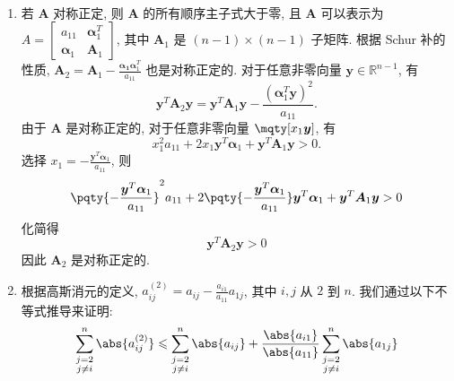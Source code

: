 \documentclass[lang = zh]{iwork}
\begin{document}
\begin{sol} ~
  \begin{enumerate}
    \item 若 $\bm{A}$ 对称正定, 则 $\bm{A}$ 的所有顺序主子式大于零, 且 $\bm{A}$ 可以表示为 $A =
            \begin{bmatrix}
              a_{11}        & \bm{\alpha}_1^T \\
              \bm{\alpha}_1 & \bm{A}_1
            \end{bmatrix}
          $, 其中 $\bm{A}_1$ 是 $(n - 1) \times (n - 1)$ 子矩阵.
          根据 Schur 补的性质, $\bm{A}_2 = \bm{A}_1 - \frac{\bm{\alpha_1} \bm{\alpha}_1^T}{a_{11}}$ 也是对称正定的.
          对于任意非零向量 $\bm{y} \in \mathbb{R}^{n - 1}$, 有
          \begin{equation*}
            \bm{y}^T \bm{A}_2 \bm{y} = \bm{y}^T \bm{A}_1 \bm{y} - \frac{(\bm{\alpha}_1^T \bm{y})^2}{a_{11}}.
          \end{equation*}
          由于 $\bm{A}$ 是对称正定的, 对于任意非零向量 $\mqty[x_1 \\ \bm{y}]$, 有
          \begin{equation*}
            x_1^2 a_{11} + 2 x_1 \bm{y}^T \bm{\alpha}_1 + \bm{y}^T \bm{A}_1 \bm{y} > 0.
          \end{equation*}
          选择 $x_1 = -\frac{\bm{y}^T \bm{\alpha}_1}{a_{11}}$, 则
          \begin{equation*}
            \pqty{-\frac{\bm{y}^T \bm{\alpha}_1}{a_{11}}}^2 a_{11} + 2 \pqty{-\frac{\bm{y}^T \bm{\alpha}_1}{a_{11}}} \bm{y}^T \bm{\alpha}_1 + \bm{y}^T \bm{A}_1 \bm{y} > 0
          \end{equation*}
          化简得
          \begin{equation*}
            \bm{y}^T \bm{A}_2 \bm{y} > 0
          \end{equation*}
          因此 $\bm{A}_2$ 是对称正定的.
    \item 根据高斯消元的定义, $a_{ij}^{(2)} = a_{ij} - \frac{a_{i1}}{a_{11}} a_{1j}$, 其中 $i, j$ 从 $2$ 到 $n$.
          我们通过以下不等式推导来证明:
          \begin{equation*}
            \sum_{\substack{j=2 \\ j \neq i}}^n \abs{a_{ij}^{(2)}} \leqslant \sum_{\substack{j=2 \\ j \neq i}}^n \abs{a_{ij}} + \frac{\abs{a_{i1}}}{\abs{a_{11}}} \sum_{\substack{j=2 \\ j \neq i}}^n \abs{a_{1j}}

\end{equation*}
\end{enumerate}
\end{sol}
\end{document}
